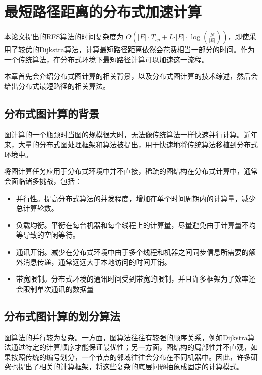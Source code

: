 \chapter{最短路径距离的分布式加速计算}
\label{sec:distribution1}

本论文提出的RFS算法的时间复杂度为 $O(\vert E \vert \cdot T_{sp} + L \cdot \vert E \vert \cdot \log(\frac{N}{\vert E \vert}))$，即使采用了较优的Dijkstra算法，计算最短路径距离依然会花费相当一部分的时间。作为一个传统算法，在分布式环境下最短路径计算可以加速这一流程。

本章首先会介绍分布式图计算的相关背景，以及分布式图计算的技术综述，然后会给出分布式最短路径的相关算法。

\section{分布式图计算的背景}

图计算的一个瓶颈时当图的规模很大时，无法像传统算法一样快速并行计算。近年来，大量的分布式图处理框架和算法被提出，用于快速地将传统算法移植到分布式环境中。

将图计算任务应用于分布式环境中并不直接，稀疏的图结构在分布式计算中，通常会面临诸多挑战，包括：

\begin{itemize}
    \item 并行性。提高分布式算法的并发程度，增加在单个时间周期内的计算量，减少总计算轮数。
    \item 负载均衡。平衡在每台机器和每个线程上的计算量，尽量避免由于计算量不均等导致的空闲等待。
    \item 通讯开销。减少在分布式环境中由于多个线程和机器之间同步信息所需要的额外消息传递，通常远远大于本地访问的时间开销。
    \item 带宽限制。分布式环境的通讯时间受到带宽的限制，并且许多框架为了效率还会限制单次通讯的数据量
\end{itemize}

\section{分布式图计算的划分算法}

图算法的并行较为复杂。一方面，图算法往往有较强的顺序关系，例如Dijkstra算法通过特定的计算顺序才能保证最优性；另一方面，图结构的局部性并不直观，如果按照传统的编号划分，一个节点的邻域往往会分布在不同机器中。因此，许多研究也提出了相关的计算框架，将这些复杂的底层问题抽象成固定的计算模式。

